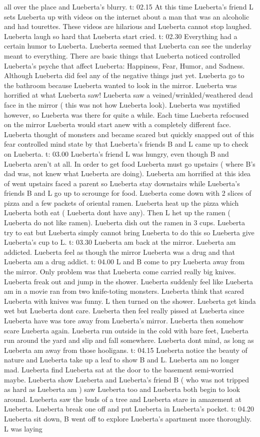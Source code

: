 \documentclass[12pt]{book}
\begin{document}
all over the place and Lueberta's blurry. t: 02.15 At this time Lueberta's friend L sets Lueberta up with videos on the internet about a man that was an alcoholic and had tourettes. These videos are hilarious and Lueberta cannot stop laughed. Lueberta laugh so hard that Lueberta start cried. t: 02.30 Everything had a certain humor to Lueberta. Lueberta seemed that Lueberta can see the underlay meant to everything. There are basic things that Lueberta noticed controlled Lueberta's psyche that affect Lueberta: Happiness, Fear, Humor, and Sadness. Although Lueberta did feel any of the negative things just yet. Lueberta go to the bathroom because Lueberta wanted to look in the mirror. Lueberta was horrified at what Lueberta saw! Lueberta saw a veined/wrinkled/weathered dead face in the mirror ( this was not how Lueberta look). Lueberta was mystified however, so Lueberta was there for quite a while. Each time Lueberta refocused on the mirror Lueberta would start anew with a completely different face. Lueberta thought of monsters and became scared but quickly snapped out of this fear controlled mind state by that Lueberta's friends B and L came up to check on Lueberta. t: 03.00 Lueberta's friend L was hungry, even though B and Lueberta aren't at all. In order to get food Lueberta must go upstairs ( where B's dad was, not knew what Lueberta are doing). Lueberta am horrified at this idea of went upstairs faced a parent so Lueberta stay downstairs while Lueberta's friends B and L go up to scrounge for food. Lueberta come down with 2 slices of pizza and a few packets of oriental ramen. Lueberta heat up the pizza which Lueberta both eat ( Lueberta dont have any). Then L het up the ramen ( Lueberta do not like ramen). Lueberta dish out the ramen in 3 cups. Lueberta try to eat but Lueberta simply cannot bring Lueberta to do this so Lueberta give Lueberta's cup to L. t: 03.30 Lueberta am back at the mirror. Lueberta am addicted. Lueberta feel as though the mirror Lueberta was a drug and that Lueberta am a drug addict. t: 04.00 L and B come to pry Lueberta away from the mirror. Only problem was that Lueberta come carried really big knives. Lueberta freak out and jump in the shower. Lueberta suddenly feel like Lueberta am in a movie ran from two knife-toting monsters. Lueberta think that scared Lueberta with knives was funny. L then turned on the shower. Lueberta get kinda wet but Lueberta dont care. Lueberta then feel really pissed at Lueberta since Lueberta have was tore away from Lueberta's mirror. Lueberta then somehow scare Lueberta again. Lueberta run outside in the cold with bare feet, Lueberta run around the yard and slip and fall somewhere. Lueberta dont mind, as long as Lueberta am away from those hooligans. t: 04.15 Lueberta notice the beauty of nature and Lueberta take up a leaf to show B and L. Lueberta am no longer mad. Lueberta find Lueberta sat at the door to the basement semi-worried maybe. Lueberta show Lueberta and Lueberta's friend B ( who was not tripped as hard as Lueberta am ) saw Lueberta too and Lueberta both begin to look around. Lueberta saw the buds of a tree and Lueberta stare in amazement at Lueberta. Lueberta break one off and put Lueberta in Lueberta's pocket. t: 04.20 Lueberta sit down, B went off to explore Lueberta's apartment more thoroughly. L was laying 
\end{document}

